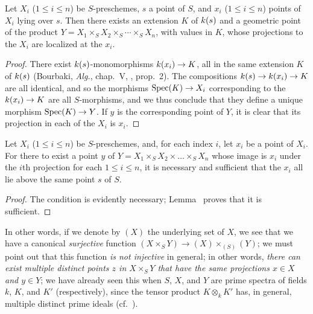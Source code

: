 \begin{lemma}[3.4.6]
\label{1.3.4.6}
Let $X_i$ ($1\leq i\leq n$) be $S$-preschemes, $s$ a point of $S$, and $x_i$
($1\leq i\leq n$) points of $X_i$ lying over $s$. Then there exists an extension
$K$ of $k(s)$ and a geometric point of the product
$Y=X_1\times_S X_2\times_S\cdots\times_S X_n$, with values in $K$, whose projections to
the $X_i$ are localized at the $x_i$.
\end{lemma}

\begin{proof}
\label{proof-1.3.4.6}
There exist $k(s)$-monomorphisms $\kres(x_i)\to K$, all in the same extension $K$ of $k(s)$ (Bourbaki, \emph{Alg.}, chap.~V, , prop.~2).
The compositions $\kres(s)\to\kres(x_i)\to K$ are all identical, and so the morphisms $\Spec(K)\to X_i$ corresponding to the $\kres(x_i)\to K$ are all $S$-morphisms, and we thus conclude that they define a unique morphism $\Spec(K)\to Y$.
If $y$ is the corresponding point of $Y$, it is clear that its projection in each of the $X_i$ is $x_i$.
\end{proof}

\begin{proposition}[3.4.7]
\label{1.3.4.7}
Let $X_i$ ($1\leq i\leq n$) be $S$-preschemes, and, for each index $i$, let $x_i$ be a point of $X_i$.
For there to exist a point $y$ of $Y=X_1\times_S X_2\times\ldots\times_S X_n$ whose image is $x_i$ under the $i$th projection for each $1\leq i\leq n$, it is necessary and sufficient that the $x_i$ all lie above the same point $s$ of $S$.
\end{proposition}

\begin{proof}
\label{proof-1.3.4.7}
The condition is evidently necessary; Lemma~ proves that it is sufficient.
\end{proof}

In other words, if we denote by $(X)$ the underlying set of $X$, we see that we have a canonical \emph{surjective} function $(X\times_S Y)\to(X)\times_{(S)}(Y)$; we must point out that this function \emph{is not injective} in general; in other words, \emph{there can exist multiple distinct points $z$ in $X\times_S Y$ that have the same projections $x\in X$ and $y\in Y$}; we have already seen this when $S$, $X$, and $Y$ are prime spectra of fields $k$, $K$, and $K'$ (respectively), since the tensor product $K\otimes_k K'$ has, in general, multiple distinct prime ideals (cf.~).

